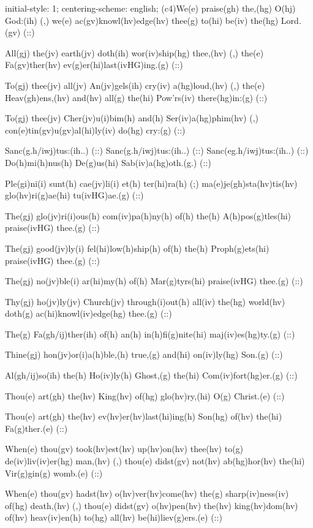 initial-style: 1;
centering-scheme: english;
(c4)We(e) praise(gh) the,(hg) O(hj) God:(ih) (,) we(e) ac(gv)knowl(hv)edge(hv) thee(g) to(hi) be(iv) the(hg) Lord.(gv) (::) 

All(gj) the(jv) earth(jv) doth(ih) wor(iv)ship(hg) thee,(hv) (,) the(e) Fa(gv)ther(hv) ev(g)er(hi)last(ivHG)ing.(g) (::)

To(gj) thee(jv) all(jv) An(jv)gels(ih) cry(iv) a(hg)loud,(hv) (,) the(e) Heav(gh)ens,(hv) and(hv) all(g) the(hi) Pow'rs(iv) there(hg)in:(g) (::)

To(gj) thee(jv) Cher(jv)u(i)bim(h) and(h) Ser(iv)a(hg)phim(hv) (,) con(e)tin(gv)u(gv)al(hi)ly(iv) do(hg) cry:(g) (::)

Sanc(g.h/iwj)tus:(ih..) (::) Sanc(g.h/iwj)tus:(ih..) (::) Sanc(eg.h/iwj)tus:(ih..) (::) Do(h)mi(h)nus(h) De(g)us(hi) Sab(iv)a(hg)oth.(g.) (::)

Ple(gi)ni(i) sunt(h) cae(jv)li(i) et(h) ter(hi)ra(h) (;) ma(e)je(gh)sta(hv)tis(hv) glo(hv)ri(g)ae(hi) tu(ivHG)ae.(g) (::)

The(gj) glo(jv)ri(i)ous(h) com(iv)pa(h)ny(h) of(h) the(h) A(h)pos(g)tles(hi) praise(ivHG) thee.(g) (::)

The(gj) good(jv)ly(i) fel(hi)low(h)ship(h) of(h) the(h) Proph(g)ets(hi) praise(ivHG) thee.(g) (::)

The(gj) no(jv)ble(i) ar(hi)my(h) of(h) Mar(g)tyrs(hi) praise(ivHG) thee.(g) (::)

Thy(gj) ho(jv)ly(jv) Church(jv) through(i)out(h) all(iv) the(hg) world(hv) doth(g) ac(hi)knowl(iv)edge(hg) thee.(g) (::)

The(g) Fa(gh/ij)ther(ih) of(h) an(h) in(h)fi(g)nite(hi) maj(iv)es(hg)ty.(g) (::)

Thine(gj) hon(jv)or(i)a(h)ble,(h) true,(g) and(hi) on(iv)ly(hg) Son.(g) (::)

Al(gh/ij)so(ih) the(h) Ho(iv)ly(h) Ghost,(g) the(hi) Com(iv)fort(hg)er.(g) (::)

Thou(e) art(gh) the(hv) King(hv) of(hg) glo(hv)ry,(hi) O(g) Christ.(e) (::)

Thou(e) art(gh) the(hv) ev(hv)er(hv)last(hi)ing(h) Son(hg) of(hv) the(hi) Fa(g)ther.(e) (::)

When(e) thou(gv) took(hv)est(hv) up(hv)on(hv) thee(hv) to(g) de(iv)liv(iv)er(hg) man,(hv) (,) thou(e) didst(gv) not(hv) ab(hg)hor(hv) the(hi) Vir(g)gin(g) womb.(e) (::)

When(e) thou(gv) hadst(hv) o(hv)ver(hv)come(hv) the(g) sharp(iv)ness(iv) of(hg) death,(hv) (,) thou(e) didst(gv) o(hv)pen(hv) the(hv) king(hv)dom(hv) of(hv) heav(iv)en(h) to(hg) all(hv) be(hi)liev(g)ers.(e) (::)

